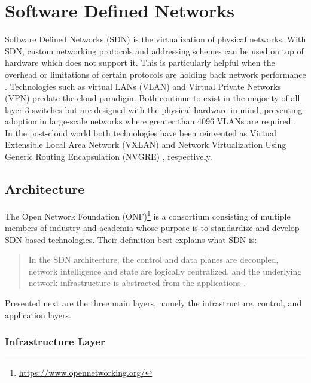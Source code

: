 \documentclass[12pt]{article}
\begin{document}



\section{Software Defined Networks} \label{sec:sdn}

Software Defined Networks (SDN) is the virtualization of physical networks. With SDN, custom networking protocols and addressing schemes can be used on top of hardware which does not support it. This is particularly helpful when the overhead or limitations of certain protocols are holding back network performance \cite{Jennings2015}. Technologies such as virtual LANs (VLAN) \cite{vlan} and Virtual Private Networks (VPN) \cite{vlan} predate the cloud paradigm. Both continue to exist in the majority of all layer 3 switches but are designed with the physical hardware in mind, preventing adoption in large-scale networks where greater than 4096 VLANs are required \cite{wang2015survey}. In the post-cloud world both technologies have been reinvented as Virtual Extensible Local Area Network (VXLAN) \cite{vxlan} and Network Virtualization Using Generic Routing Encapsulation (NVGRE) \cite{nvgre}, respectively.



\subsection{Architecture}

The Open Network Foundation (ONF)\footnote{\url{https://www.opennetworking.org/}} is a consortium consisting of multiple members of industry and academia whose purpose is to standardize and develop SDN-based technologies. Their definition best explains what SDN is:

\begin{quote}
    In the SDN architecture, the control and data planes are decoupled, network intelligence and state are logically centralized, and the underlying network infrastructure is abstracted from the applications \cite{onfSDNdef}.
\end{quote}

Presented next are the three main layers, namely the infrastructure, control, and application layers.

\subsubsection{Infrastructure Layer}
\end{document}
